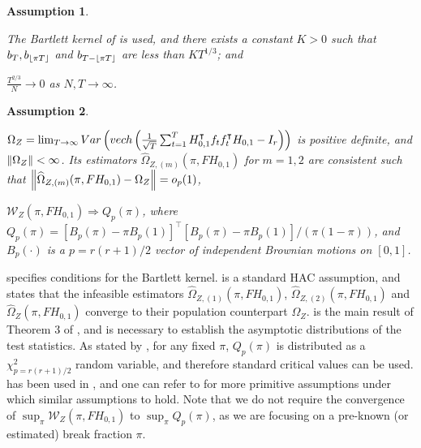 \documentclass[12pt]{article}
\newtheorem{assump}{Assumption}
\newcommand*{\tran}{\intercal}
\theoremstyle{plain}
\numberwithin{equation}{section}
\begin{document}
\begin{assump}
\label{ass:9:hac_conditions}
\begin{assumpenum}
\item \label{ass:9:hac_conditions:1}
The Bartlett kernel of \textcite{newey_simple_1987} is used, and there exists a constant $K \gt 0$ such that $b_T, b_{\left \lfloor \pi T \right \rfloor}$ and $b_{T - \left \lfloor \pi T \right \rfloor}$ are less than $K T^{1/3}$; and
\item \label{ass:9:hac_conditions:2}
$\frac{T^{2/3}}{N} \to 0$ as $N, T \to \infty$.
\end{assumpenum}
\end{assump}
\begin{assump}
\label{ass:10:HAC_assump}
\begin{assumpenum}
\item \label{ass:10:HAC_assump:1}
$\Omega_Z = \limT Var\left( vech\left(  \frac{1}{\sqrt{T}} \sumT H_{0, 1}^{\tran} f_t f_t^\tran H_{0, 1} - I_r \right) \right)$ is positive definite, and $\norm{\Omega_Z} < \infty$. Its estimators $\widehat{\Omega}_{Z, (m)}(\pi, FH_{0, 1})$ for $m = 1, 2$ are consistent such that $\norm{\widehat{\Omega}_{Z, (m)}(\pi, FH_{0, 1}) - \Omega_Z} = o_p(1)$,
\item \label{ass:10:HAC_assump:2} 
$\mathscr{W}_Z(\pi, FH_{0, 1}) \Rightarrow Q_p(\pi)$, where $Q_p(\pi) = [B_p(\pi) - \pi B_p(1)]^\tran [B_p (\pi) - \pi B_p(1)]/(\pi(1 - \pi))$, and $B_p(\cdot)$ is a $p = r(r + 1)/2$ vector of independent Brownian motions on $[0, 1]$. 
\end{assumpenum}
\end{assump}
 specifies conditions for the Bartlett kernel.
 is a standard HAC assumption, and states that the infeasible estimators $\widehat{\Omega}_{Z, (1)}(\pi, FH_{0, 1})$, $\widehat{\Omega}_{Z, (2)}(\pi, FH_{0, 1})$ and $\widehat{\Omega}_{Z}(\pi, FH_{0, 1})$ converge to their population counterpart $\Omega_Z$.
 is the main result of Theorem 3 of \textcite{andrews_tests_1993}, and is necessary to establish the asymptotic distributions of the test statistics. As stated by \textcite{andrews_tests_1993}, for any fixed $\pi$, $Q_p(\pi)$ is distributed as a $\chi^2_{p = r(r + 1)/2}$ random variable, and therefore standard critical values can be used.  has been used in \textcite{han_tests_2015}, and one can refer to \textcite{chen_detecting_2014} for more primitive assumptions under which similar assumptions to  hold. Note that we do not require the convergence of $\sup_{\pi} \mathscr{W}_Z(\pi, FH_{0, 1})$ to $\sup_{\pi} Q_p(\pi)$, as we are focusing on a pre-known (or estimated) break fraction $\pi$.
\end{document}
